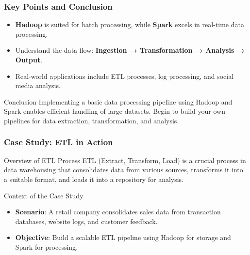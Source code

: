 \documentclass[aspectratio=169]{beamer}
\begin{document}
\begin{frame}[fragile]
    \frametitle{Key Points and Conclusion}
    \begin{itemize}
        \item \textbf{Hadoop} is suited for batch processing, while \textbf{Spark} excels in real-time data processing.
        
        \item Understand the data flow: \textbf{Ingestion → Transformation → Analysis → Output}.
        
        \item Real-world applications include ETL processes, log processing, and social media analysis.
    \end{itemize}
    \begin{block}{Conclusion}
        Implementing a basic data processing pipeline using Hadoop and Spark enables efficient handling of large datasets. Begin to build your own pipelines for data extraction, transformation, and analysis.
    \end{block}
\end{frame}

\begin{frame}[fragile]
    \frametitle{Case Study: ETL in Action}
    \begin{block}{Overview of ETL Process}
        ETL (Extract, Transform, Load) is a crucial process in data warehousing that consolidates data from various sources, transforms it into a suitable format, and loads it into a repository for analysis. 
    \end{block}
    \begin{block}{Context of the Case Study}
        \begin{itemize}
            \item \textbf{Scenario}: A retail company consolidates sales data from transaction databases, website logs, and customer feedback.
            \item \textbf{Objective}: Build a scalable ETL pipeline using Hadoop for storage and Spark for processing.
        \end{itemize}
    \end{block}
\end{frame}
\end{document}
